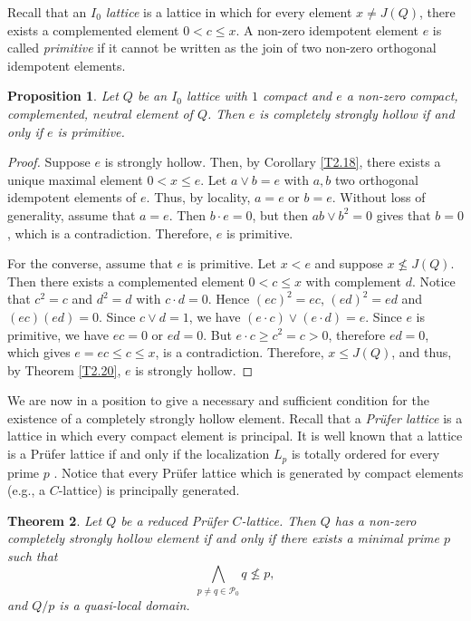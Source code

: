 \documentclass[11pt,english]{amsart}
\newtheorem{theorem}{Theorem}[section]
\newtheorem{proposition}[theorem]{Proposition}
\theoremstyle{definition}
\numberwithin{equation}{section}
\theoremstyle{remark}
\def\leq{\leqslant}
\begin{document}
	Recall that an \emph{$I_0$ lattice} is a lattice in which for every element $x\neq J(Q)$, there exists a complemented element $0<c\leq x$. A non-zero idempotent element $e$ is called \emph{primitive} if it cannot be written as the join of two non-zero orthogonal idempotent elements.
	
	\begin{proposition}
		Let $Q$ be an $I_0$ lattice with $1$ compact and $e$ a non-zero compact, complemented, neutral element of $Q$. Then $e$ is completely strongly hollow if and only if $e$ is primitive.
	\end{proposition}
	
	\begin{proof}
		Suppose $e$ is strongly hollow. Then, by Corollary \ref{T2.18},  there exists a unique maximal element $0<x\leq e$. Let $a\vee b =e$ with $a,b$ two orthogonal idempotent elements of $e$. Thus, by locality, $a=e$ or $b=e$. Without loss of generality, assume that $a=e$. Then $b\cdot e=0$, but then $ab\vee b^2 =0$ gives that $b=0$, which is a contradiction. Therefore, $e$ is primitive. 
		
		For the converse, assume that $e$ is primitive. Let $x<e$ and suppose $x\nleq J(Q).$ Then there exists a complemented element $0<c\leq x$ with complement $d$. Notice that $c^2=c$ and $d^2=d$ with $c\cdot d=0$. Hence \((ec)^2=ec\), \((ed)^2=ed\) and \((ec)(ed)=0\). Since $c\vee d=1$, we have  \((e\cdot c)\vee(e\cdot d)=e\). Since $e$ is primitive, we have  $ec=0$ or $ed=0$. But $e\cdot c \geqslant c^2=c>0$, therefore $ed=0$, which gives $e=ec\leq c\leq x$, is a contradiction. Therefore, $x\leq J(Q)$, and thus, by Theorem \ref{T2.20}, $e$ is strongly hollow.
	\end{proof}
	
	We are now in a position to give a necessary and sufficient condition for the existence of a completely strongly hollow element. Recall that a \emph{Pr\"ufer lattice} is a lattice in which every compact element is principal. It is well known that a lattice is a Pr\"ufer lattice if and only if the localization $L_p$ is totally ordered for every prime $p$ \cite[p. 2]{Pri-Pru}. Notice that every Pr\"ufer lattice which is generated by compact elements (e.g., a $C$-lattice) is principally generated. 
	
	\begin{theorem}\label{T3.8}
		Let $Q$ be a reduced Pr\"ufer $C$-lattice. Then $Q$ has a non-zero completely strongly hollow element if and only if there exists a minimal prime $p$ such that \[\bigwedge_{p\neq q\in \mathcal{P}_0}q\nleq p,\]
		and $Q/p$ is a quasi-local domain.
	\end{theorem}
	
\end{document}
